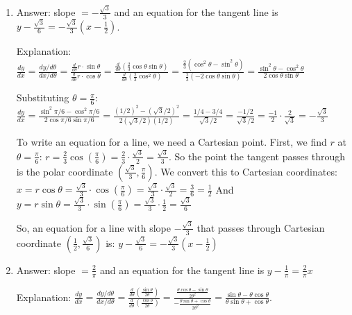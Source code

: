 \begin{Answer}[ref = polar3]
\begin{enumerate}
\item Answer: slope $ = -\frac{\sqrt{3}}{3}$ and an equation for the tangent 
line is $y - \frac{\sqrt{3}}{6} = -\frac{\sqrt{3}}{3} \left( x - \frac{1}{2} 
\right)$. 

Explanation: $\frac{dy}{dx} = \frac{dy/d\theta}{dx/d\theta} = \frac{\frac{d}{d
\theta}r \cdot \sin{\theta}}{\frac{d}{d\theta} r \cdot \cos{\theta}} = \frac{
\frac{d}{d\theta} \left( \frac{2}{3} \cos{\theta} \sin{\theta} \right)}{\frac{
d}{d\theta} \left( \frac{2}{3} \cos^2{\theta} \right)} = \frac{\frac{2}{3} 
\left( \cos^2{\theta} -\sin^2{\theta} \right)}{\frac{2}{3} \left( -2\cos{
\theta}\sin{\theta}\right)} = \frac{\sin^2{\theta} - \cos^2{\theta}}{2\cos{
\theta}\sin{\theta}}$

Substituting $\theta = \frac{\pi}{6}$: $\frac{dy}{dx} = \frac{\sin^2{\pi/6} - 
\cos^2{\pi/6}}{2\cos{\pi/6}\sin{\pi/6}} = \frac{\left(1/2 \right)^2 - \left(
\sqrt{3}/2\right)^2}{2\left(\sqrt{3}/2\right) \left(1/2\right)} = \frac{1/4 - 
3/4}{\sqrt{3}/2} = \frac{-1/2}{\sqrt{3}/2} = \frac{-1}{2} \cdot \frac{2}{\sqrt{
3}} = -\frac{\sqrt{3}}{3}$

To write an equation for a line, we need a Cartesian point. First, we find $r$ 
at $\theta = \frac{\pi}{6}$: $r = \frac{2}{3}\cos{\left( \frac{\pi}{6} \right)}
= \frac{2}{3} \cdot \frac{\sqrt{3}}{2} = \frac{\sqrt{3}}{3}$. So the point the 
tangent passes through is the polar coordinate $\left( \frac{\sqrt{3}}{3}, 
\frac{\pi}{6} \right)$. We convert this to Cartesian coordinates: $x = r \cos{
\theta} = \frac{\sqrt{3}}{3} \cdot \cos{\left( \frac{\pi}{6} \right)} = \frac{
\sqrt{3}}{3} \cdot \frac{\sqrt{3}}{2} = \frac{3}{6} = \frac{1}{2}$ And $y = r
\sin{\theta} = \frac{\sqrt{3}}{3} \cdot \sin{\left( \frac{\pi}{6} \right)} = 
\frac{\sqrt{3}}{3} \cdot \frac{1}{2} = \frac{\sqrt{3}}{6}$

So, an equation for a line with slope $-\frac{\sqrt{3}}{3}$ that passes 
through Cartesian coordinate $\left( \frac{1}{2}, \frac{\sqrt{3}}{6} \right)$ 
is: $y - \frac{\sqrt{3}}{6} = -\frac{\sqrt{3}}{3} \left( x - \frac{1}{2} 
\right)$

\item Answer: slope $= \frac{2}{\pi}$ and an equation for the tangent line is 
$y - \frac{1}{\pi} = \frac{2}{\pi}x$

Explanation: $\frac{dy}{dx} = \frac{dy/d\theta}{dx/d\theta} = \frac{\frac{d}{d
\theta} \left( \frac{\sin{\theta}}{2\theta}\right)}{\frac{d}{d\theta} \left( 
\frac{\cos{\theta}}{2\theta}\right)} = \frac{\frac{\theta \cos{\theta} - \sin{
\theta}}{2\theta^2}}{-\frac{\theta\sin{\theta} + \cos{\theta}}{2\theta^2}} = 
\frac{\sin{\theta} - \theta\cos{\theta}}{\theta\sin{\theta} + \cos{\theta}}$. 


\end{enumerate}
\end{Answer}
